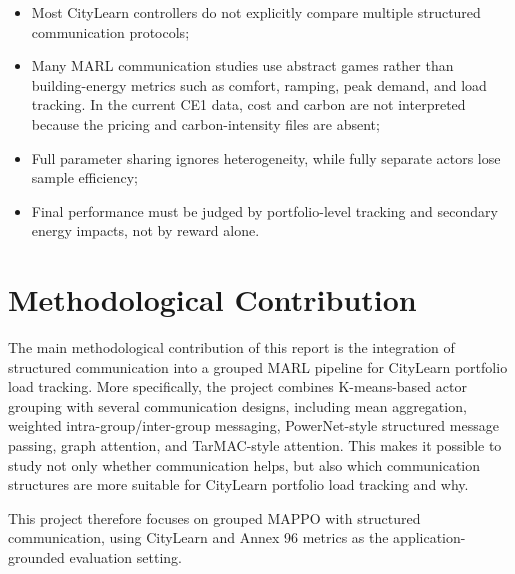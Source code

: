 \begin{itemize}
  \item Most CityLearn controllers do not explicitly compare multiple
  structured communication protocols;
  \item Many MARL communication studies use abstract games rather than
  building-energy metrics such as comfort, ramping, peak demand, and load
  tracking. In the current CE1 data, cost and carbon are not interpreted because
  the pricing and carbon-intensity files are absent;
  \item Full parameter sharing ignores heterogeneity, while fully separate
  actors lose sample efficiency;
  \item Final performance must be judged by portfolio-level tracking and
  secondary energy impacts, not by reward alone.
\end{itemize}

\section{Methodological Contribution}

The main methodological contribution of this report is the integration of
structured communication into a grouped MARL pipeline for CityLearn portfolio
load tracking. More specifically, the project combines K-means-based actor
grouping with several communication designs, including mean aggregation,
weighted intra-group/inter-group messaging, PowerNet-style structured message
passing, graph attention, and TarMAC-style attention. This makes it possible to
study not only whether communication helps, but also which communication
structures are more suitable for CityLearn portfolio load tracking and why.

This project therefore focuses on grouped MAPPO with structured communication,
using CityLearn and Annex 96 metrics as the application-grounded evaluation
setting.
